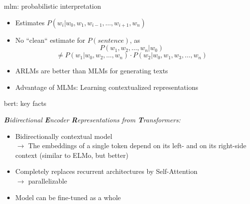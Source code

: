 
\begin{frame}{mlm: probabilistic interpretation}

\vfill

\begin{itemize}
	\item Estimates $P(w_i | w_0, w_1, w_{i-1}, \dots, w_{i+1}, w_n)$
	\item No ``clean`` estimate for $P(sentence)$, as
	$$ P(w_1, w_2, \dots, w_n | w_0)$$ $$\neq P(w_1 | w_0, w_2, \dots, w_n) \cdot P(w_2 | w_0, w_1, w_3, \dots, w_n)$$
	\item ARLMs are better than MLMs for generating texts 
	\item Advantage of MLMs: Learning contextualized representations
\end{itemize}

\vfill

\end{frame}



\begin{frame}{bert: key facts}

\vfill

\textit{\textbf{B}idirectional \textbf{E}ncoder \textbf{R}epresentations from \textbf{T}ransformers:}

\vspace{.5cm}

\begin{itemize}
		\item Bidirectionally contextual model\\
					$\to$ The embeddings of a single token depend on its left- and on its right-side context (similar to ELMo, but better)
		\item Completely replaces recurrent architectures by Self-Attention\\
					$\to$ parallelizable
		\item Model can be fine-tuned as a whole
\end{itemize}

\vfill

\end{frame}



